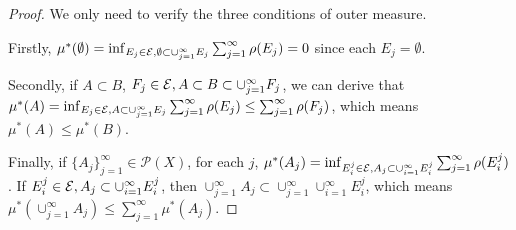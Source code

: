 \begin{proof}
    We only need to verify the three conditions of outer measure.

    Firstly, $\mu^{*}(\emptyset)=\inf_{E_j\in\mathcal{E},\emptyset\subset\cup_{j=1}^{\infty}E_j}
    \sum_{j=1}^{\infty}\rho(E_j)=0$ since each $E_j=\emptyset$.

    Secondly, if  $A\subset B$, $F_j\in\mathcal{E},A\subset B\subset\cup_{j=1}^{\infty}F_j$,
    we can derive that $\mu^{*}(A)=\inf_{E_j\in\mathcal{E},A\subset\cup_{j=1}^{\infty}E_j}
    \sum_{j=1}^{\infty}\rho(E_j)\leq \sum_{j=1}^{\infty}\rho(F_j)$, which means 
    $\mu^{*}(A)\leq\mu^{*}(B)$.

    Finally, if $\{A_j\}_{j=1}^{\infty}\in\mathcal{P}(X)$,
    for each $j$, $\mu^{*}(A_j)=\inf_{E_i^j\in\mathcal{E},A_j\subset\cup_{i=1}^{\infty}E_i^j}
    \sum_{j=1}^{\infty}\rho(E_i^j)$. If $E_i^j\in\mathcal{E},A_j\subset\cup_{i=1}^{\infty}E_i^j$,
    then $\cup_{j=1}^{\infty}A_j\subset\cup_{j=1}^{\infty}\cup_{i=1}^{\infty}E_i^j$,
    which means $\mu^{*}(\cup_{j=1}^{\infty}A_j)\leq\sum_{j=1}^{\infty}\mu^{*}(A_j)$.
\end{proof}
